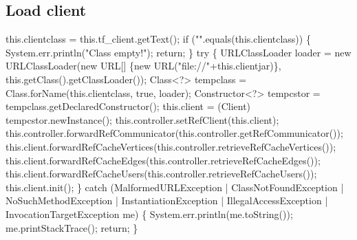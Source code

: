 \subsection{Load client}
\nwenddocs{}\endmoddef{}
this.clientclass = this.tf_client.getText();
if ("".equals(this.clientclass)) \{
  System.err.println("Class empty!");
  return;
\}
try \{
  URLClassLoader loader = new URLClassLoader(new URL[] \{new URL("file://"+this.clientjar)\},
      this.getClass().getClassLoader());
  Class<?> tempclass = Class.forName(this.clientclass, true, loader);
  Constructor<?> tempcstor = tempclass.getDeclaredConstructor();
  this.client = (Client) tempcstor.newInstance();
  this.controller.setRefClient(this.client);
  this.controller.forwardRefCommunicator(this.controller.getRefCommunicator());
  this.client.forwardRefCacheVertices(this.controller.retrieveRefCacheVertices());
  this.client.forwardRefCacheEdges(this.controller.retrieveRefCacheEdges());
  this.client.forwardRefCacheUsers(this.controller.retrieveRefCacheUsers());
  this.client.init();
\} catch (MalformedURLException
    | ClassNotFoundException
    | NoSuchMethodException
    | InstantiationException
    | IllegalAccessException
    | InvocationTargetException me) \{
  System.err.println(me.toString());
  me.printStackTrace();
  return;
\}
\nwendcode{}\nwdocspar

